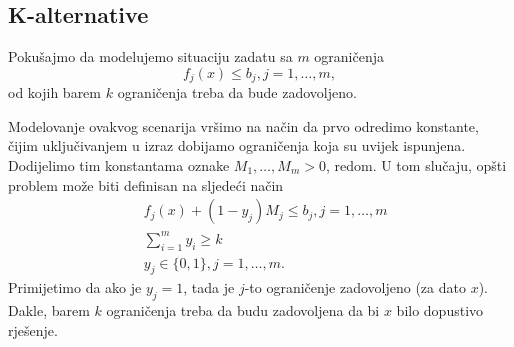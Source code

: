 \documentclass[b5paper, utf8, 11pt, colorlinks]{book}
\theoremstyle{definition}
\begin{document}

\subsection{K-alternative} 

Pokušajmo da modelujemo situaciju zadatu sa $m$ ograničenja
$$f_j(x) \leq  b_j, j=1,\ldots,m,$$
od kojih barem $k$ ograničenja treba da bude zadovoljeno.

Modelovanje ovakvog scenarija vršimo na način da prvo odredimo konstante, čijim uključivanjem u izraz dobijamo ograničenja koja su uvijek ispunjena. Dodijelimo tim konstantama oznake  $M_1, \ldots, M_m>0$, redom. U tom slučaju, opšti problem može biti definisan na sljedeći način
\begin{align}
	&f_j(x) + (1-y_j) M_j \leq b_j, j=1,\ldots,m\\
	& \sum_{i=1}^m y_i \geq k \\
	& y_j \in \{0,1\}, j=1,\ldots,m.
\end{align}
Primijetimo da ako je $y_j = 1$, tada je $j$-to ograničenje zadovoljeno (za dato $x$). Dakle, barem $k$ ograničenja treba da budu zadovoljena da bi $x$ bilo dopustivo rješenje. 

\end{document}
